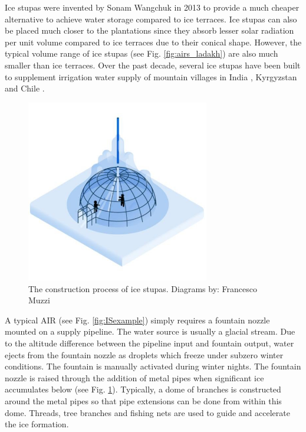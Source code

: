 Ice stupas were invented by Sonam Wangchuk in 2013 \cite{wangchukIceStupaArtificial2014} to provide a much
cheaper alternative to achieve water storage compared to ice terraces. Ice stupas can also be placed much closer
to the plantations since they absorb lesser solar radiation per unit volume compared to ice terraces due to
their conical shape. However, the typical volume range of ice stupas (see Fig. \ref{fig:airs_ladakh}) are also
much smaller than ice terraces. Over the past decade, several ice stupas have been built to supplement
irrigation water supply of mountain villages in India \citep{wangchukIceStupaCompetition2020,
palmerStoringFrozenWater2022, aggarwalAdaptationClimateChange2021}, Kyrgyzstan
\citep{bbcnewsBrightArtificialGlacier2020} and Chile \citep{reutersConservationistsChileAim2021}.


\begin{figure}[htb]
\centering
\includegraphics[width=8cm]{figs/IS_science.jpg}
\caption{The construction process of ice stupas. Diagrams by: Francesco Muzzi }
\label{fig:ISconstruction}
\end{figure}

A typical AIR (see Fig. \ref{fig:ISexample}) simply requires a fountain nozzle mounted on a supply pipeline. The
water source is usually a glacial stream. Due to the altitude difference between the pipeline input and fountain
output, water ejects from the fountain nozzle as droplets which freeze under subzero winter conditions. The
fountain is manually activated during winter nights. The fountain nozzle is raised through the addition of metal
pipes when significant ice accumulates below (see Fig. \ref{fig:ISconstruction}).  Typically, a dome of branches
is constructed around the metal pipes so that pipe extensions can be done from within this dome. Threads, tree
branches and fishing nets are used to guide and accelerate the ice formation.

